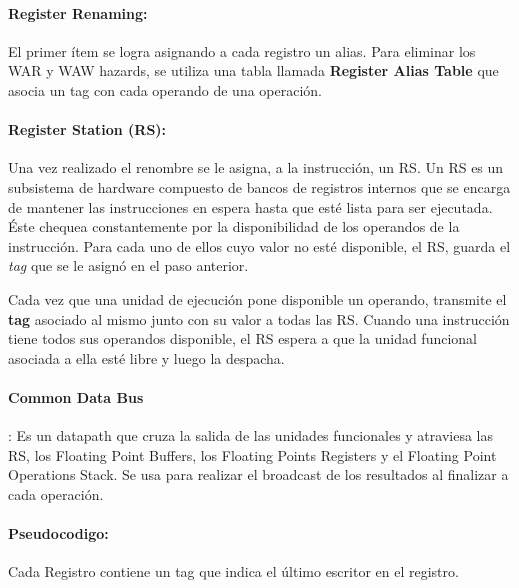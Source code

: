 \paragraph{Register Renaming:} El primer ítem se logra asignando a cada registro un alias. Para eliminar los WAR y WAW hazards, se utiliza una tabla llamada \textbf{Register Alias Table} que asocia un tag con cada operando de una operación.

\paragraph{Register Station (RS):} Una vez realizado el renombre se le asigna, a la instrucción, un RS. Un RS es un subsistema de hardware compuesto de bancos de registros internos que se encarga de mantener las instrucciones en espera hasta que esté lista para ser ejecutada. Éste chequea constantemente por la disponibilidad de los operandos de la instrucción. Para cada uno de ellos cuyo valor no esté disponible, el RS, guarda el \textit{tag} que se le asignó en el paso anterior.

Cada vez que una unidad de ejecución pone disponible un operando, transmite el \textbf{tag} asociado al mismo junto con su valor a todas las RS. Cuando una instrucción tiene todos sus operandos disponible, el RS espera a que la unidad funcional asociada a ella esté libre y luego la despacha.

\paragraph{Common Data Bus}: Es un datapath que cruza la salida de las unidades funcionales y atraviesa las RS, los Floating Point Buffers, los Floating Points Registers y el Floating Point Operations Stack. Se usa para realizar el broadcast de los resultados al finalizar a cada operación.

\paragraph{Pseudocodigo:}
Cada Registro contiene un tag que indica el último escritor en el registro.

